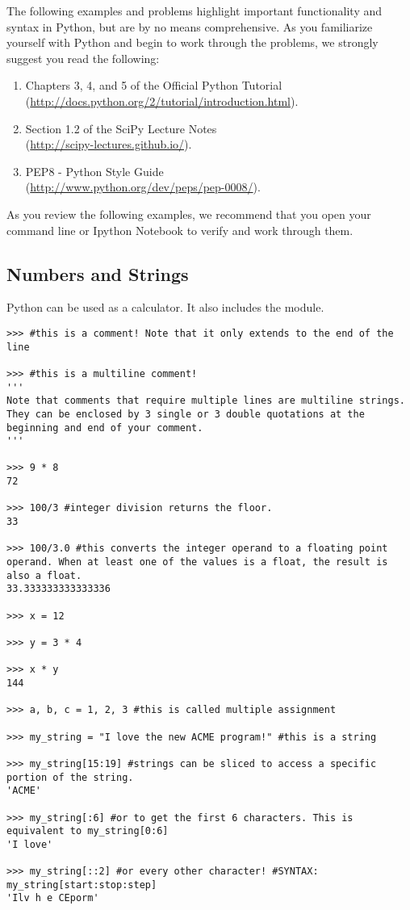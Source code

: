 The following examples and problems highlight important functionality
and syntax in Python, but are by no means comprehensive.
As you familiarize yourself with Python and begin to work through the problems,  we strongly suggest you read the following:
\begin{enumerate}
\item Chapters 3, 4, and 5 of the Official Python Tutorial \\
        (\url{http://docs.python.org/2/tutorial/introduction.html}).
\item Section 1.2 of the SciPy Lecture Notes \\
        (\url{http://scipy-lectures.github.io/}).
\item PEP8 - Python Style Guide \\
        (\url{http://www.python.org/dev/peps/pep-0008/}).
\end{enumerate}


As you review the following examples, we recommend that you open your command line or Ipython Notebook to verify and work through them.

\subsection*{Numbers and Strings}

\begin{example}
Python can be used as a calculator. It also 
includes the  module.

\begin{lstlisting}
>>> #this is a comment! Note that it only extends to the end of the line

>>> #this is a multiline comment!
''' 
Note that comments that require multiple lines are multiline strings.
They can be enclosed by 3 single or 3 double quotations at the beginning and end of your comment. 
'''

>>> 9 * 8
72

>>> 100/3 #integer division returns the floor.
33

>>> 100/3.0 #this converts the integer operand to a floating point operand. When at least one of the values is a float, the result is also a float. 
33.333333333333336

>>> x = 12

>>> y = 3 * 4

>>> x * y
144

>>> a, b, c = 1, 2, 3 #this is called multiple assignment

>>> my_string = "I love the new ACME program!" #this is a string

>>> my_string[15:19] #strings can be sliced to access a specific portion of the string.
'ACME'

>>> my_string[:6] #or to get the first 6 characters. This is equivalent to my_string[0:6]
'I love'

>>> my_string[::2] #or every other character! #SYNTAX: my_string[start:stop:step]
'Ilv h e CEporm'

\end{lstlisting}
\end{example}

